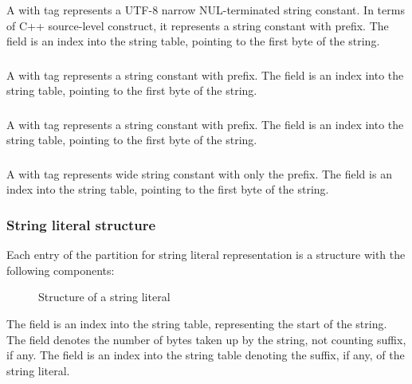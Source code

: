 \subsubsection{}
A  with tag   represents a UTF-8 narrow NUL-terminated string constant. 
In terms of C++ source-level construct, it represents a string constant with  prefix.
The  field is an index into the string table, pointing to the first byte of the string.

\subsubsection{}
A  with tag   represents a  string constant with  prefix.
The  field is an index into the string table, pointing to the first byte of the string.


\subsubsection{}
A  with tag   represents a  string constant with  prefix.
The  field is an index into the string table, pointing to the first byte of the string.


\subsubsection{}

A  with tag   represents wide string constant with only the  prefix.
The  field is an index into the string table, pointing to the first byte of the string.


\subsubsection{String literal structure}
Each entry of the partition for string literal representation is a structure with the following components:
%
\begin{figure}[H]
	\centering
	\caption{Structure of a string literal}
	\label{fig:ifc-string-literal-structure}
\end{figure}
%
The  field is an index into the string table, representing the start of the string.
The  field denotes the number of bytes taken up by the string, not counting suffix, if any.
The  field is an index into the string table denoting the suffix, if any, of the string literal.

